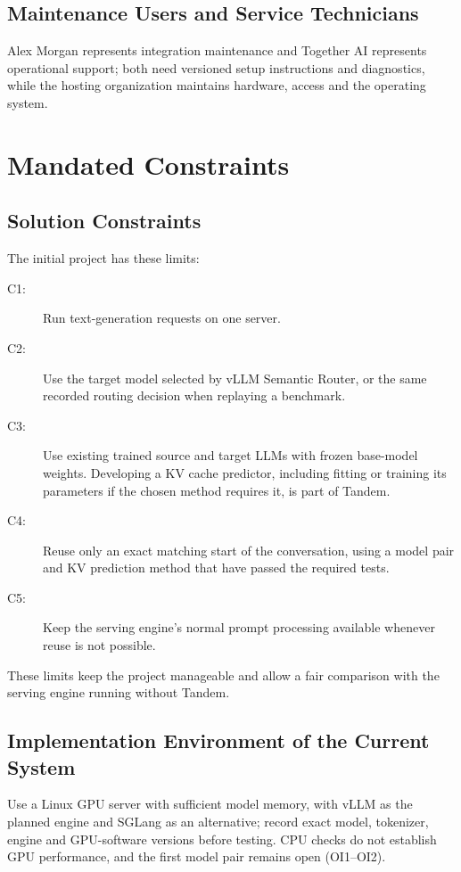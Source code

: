 \documentclass[12pt]{article}
\begin{document}
\subsection{Maintenance Users and Service Technicians}
Alex Morgan represents integration maintenance and Together AI represents
operational support; both need versioned setup instructions and diagnostics,
while the hosting organization maintains hardware, access and the operating system.


\section{Mandated Constraints}


\subsection{Solution Constraints}
The initial project has these limits:
\begin{description}
\item[C1:] Run text-generation requests on one server.
\item[C2:] Use the target model selected by vLLM Semantic Router, or the same
recorded routing decision when replaying a benchmark.
\item[C3:] Use existing trained source and target LLMs with frozen base-model
weights. Developing a KV cache predictor, including fitting or training its
parameters if the chosen method requires it, is part of Tandem.
\item[C4:] Reuse only an exact matching start of the conversation, using a
model pair and KV prediction method that have passed the required tests.
\item[C5:] Keep the serving engine's normal prompt processing available
whenever reuse is not possible.
\end{description}
These limits keep the project manageable and allow a fair comparison with the
serving engine running without Tandem.

\subsection{Implementation Environment of the Current System}
Use a Linux GPU server with sufficient model memory, with vLLM as the planned
engine and SGLang as an alternative; record exact model,
tokenizer, engine and GPU-software versions before testing. CPU checks do not
establish GPU performance, and the first model pair remains open (OI1--OI2).
\end{document}
